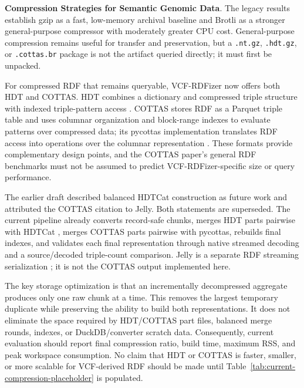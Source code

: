 \documentclass[pdflatex,sn-mathphys-num]{sn-jnl}%
\newenvironment{revision}{\begingroup\color{revisionblue}}{\endgroup}%
\theoremstyle{thmstyleone}%
\theoremstyle{thmstyletwo}%
\theoremstyle{thmstylethree}%
\begin{document}
\begin{revision}
\textbf{Compression Strategies for Semantic Genomic Data}.
The legacy results establish gzip as a fast, low-memory archival baseline and Brotli as a stronger general-purpose compressor with moderately greater CPU cost. General-purpose compression remains useful for transfer and preservation, but a \texttt{.nt.gz}, \texttt{.hdt.gz}, or \texttt{.cottas.br} package is not the artifact queried directly; it must first be unpacked.

For compressed RDF that remains queryable, VCF-RDFizer now offers both HDT and COTTAS. HDT combines a dictionary and compressed triple structure with indexed triple-pattern access \cite{hdt_2013}. COTTAS stores RDF as a Parquet triple table and uses columnar organization and block-range indexes to evaluate patterns over compressed data; its pycottas implementation translates RDF access into operations over the columnar representation \cite{cottas_2025}. These formats provide complementary design points, and the COTTAS paper's general RDF benchmarks must not be assumed to predict VCF-RDFizer-specific size or query performance.

The earlier draft described balanced HDTCat construction as future work and attributed the COTTAS citation to Jelly. Both statements are superseded. The current pipeline already converts record-safe chunks, merges HDT parts pairwise with HDTCat \cite{Diefenbach2020HDTCat}, merges COTTAS parts pairwise with pycottas, rebuilds final indexes, and validates each final representation through native streamed decoding and a source/decoded triple-count comparison. Jelly is a separate RDF streaming serialization \cite{sowinski_jelly_2025}; it is not the COTTAS output implemented here.

The key storage optimization is that an incrementally decompressed aggregate produces only one raw chunk at a time. This removes the largest temporary duplicate while preserving the ability to build both representations. It does not eliminate the space required by HDT/COTTAS part files, balanced merge rounds, indexes, or DuckDB/converter scratch data. Consequently, current evaluation should report final compression ratio, build time, maximum RSS, and peak workspace consumption. No claim that HDT or COTTAS is faster, smaller, or more scalable for VCF-derived RDF should be made until Table~\ref{tab:current-compression-placeholder} is populated.
\end{revision}
\end{document}

